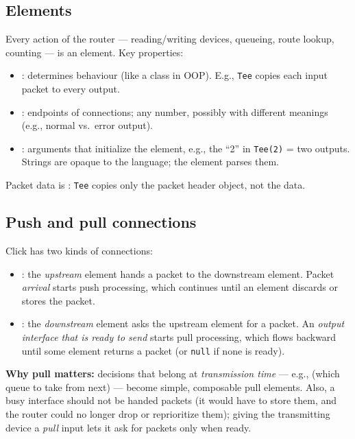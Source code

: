 \subsection{Elements}
Every action of the router --- reading/writing devices, queueing, route lookup, counting --- is an element. Key properties:
\begin{itemize}
\item {}: determines behaviour (like a class in OOP). E.g., \texttt{Tee} copies each input packet to every output.
\item {}: endpoints of connections; any number, possibly with different meanings (e.g., normal vs.\ error output).
\item {}: arguments that initialize the element, e.g., the ``2'' in \texttt{Tee(2)} = two outputs. Strings are opaque to the language; the element parses them.
\end{itemize}
Packet data is : \texttt{Tee} copies only the packet header object, not the data.

\subsection{Push and pull connections}
Click has two kinds of connections:
\begin{itemize}
\item {}: the \emph{upstream} element hands a packet to the downstream element. Packet \emph{arrival} starts push processing, which continues until an element discards or stores the packet.
\item {}: the \emph{downstream} element asks the upstream element for a packet. An \emph{output interface that is ready to send} starts pull processing, which flows backward until some element returns a packet (or \texttt{null} if none is ready).
\end{itemize}
\textbf{Why pull matters:} decisions that belong at \emph{transmission time} --- e.g.,  (which queue to take from next) --- become simple, composable pull elements. Also, a busy interface should not be handed packets (it would have to store them, and the router could no longer drop or reprioritize them); giving the transmitting device a \emph{pull} input lets it ask for packets only when ready.

